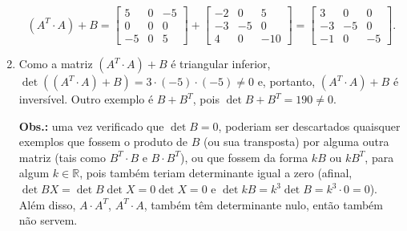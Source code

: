 \documentclass[12pt,a4paper]{article}
\newcommand*\R{\mathbb{R}}
\begin{document}
\begin{ExerciseList}
\begin{enumerate}
\[
(A^T\cdot A) + B = 
\begin{bmatrix}
5 & 0 & -5\\0 & 0 & 0\\-5 & 0 & 5
\end{bmatrix}
+
\begin{bmatrix}
-2 &  0 &  5\\
-3 & -5 &  0\\
 4 &  0 & -10
\end{bmatrix}
=
\begin{bmatrix}
 3 &  0 &  0\\
-3 & -5 &  0\\
-1 &  0 & -5
\end{bmatrix}.
\]
\item Como a matriz $(A^T \cdot A) + B$ é triangular inferior, $\det{((A^T \cdot A) + B)} = 3 \cdot(-5)\cdot(-5) \neq 0$ e, portanto, $(A^T \cdot A) + B$ é inversível. Outro exemplo é $B + B^T$, pois $\det{B + B^T} = 190 \neq 0$.

\textbf{Obs.:} uma vez verificado que $\det{B} = 0$, poderiam ser descartados quaisquer exemplos que fossem o produto de $B$ (ou sua transposta) por alguma outra matriz (tais como $B^T\cdot B$ e $B\cdot B^T$), ou que fossem da forma $k B$ ou $k B^T$, para algum $k \in \R$, pois também teriam determinante igual a zero (afinal, $\det{BX} = \det{B}\det{X} = 0 \det{X} = 0$ e $\det{k}B = k^3 \det{B} = k^3\cdot 0 = 0$). Além disso, $A\cdot A^T$, $A^T\cdot A$, também têm determinante nulo, então também não servem.
\end{enumerate}



\end{ExerciseList}
\end{document}

